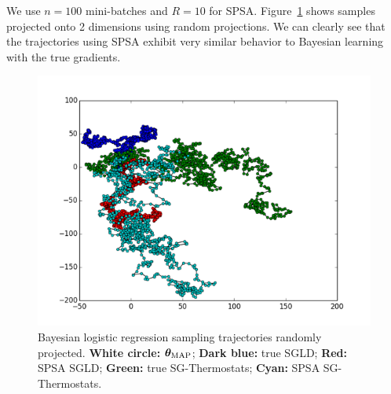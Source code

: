 \documentclass[]{article}
\begin{document}
We use $n=100$ mini-batches and $R=10$ for SPSA.  Figure~\ref{fig:blr} shows samples projected onto 2 dimensions using random projections.  We can clearly see that the trajectories using SPSA exhibit very similar behavior to Bayesian learning with the true gradients.  
\begin{figure}[t]
\begin{center}
\includegraphics[width=0.95\columnwidth]{./images/lr/random_proj.png}
\vspace{-0.15in}
\caption{\small{Bayesian logistic regression sampling trajectories randomly projected.  {\bf White circle:} ${\bm \theta}_{\text{MAP}}$}; {\bf Dark blue:} true SGLD; {\bf Red:} SPSA SGLD; {\bf Green:} true SG-Thermostats; {\bf Cyan:} SPSA SG-Thermostats.}
\label{fig:blr}
\end{center}
\vskip -0.2in
\end{figure}

%
\end{document}
